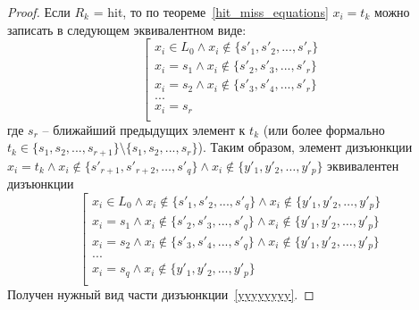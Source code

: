 \begin{proof}
  Если $R_k$ = hit, то по теореме~\ref{hit_miss_equations} $x_i =
  t_k$ можно записать в следующем эквивалентном виде:
  $$\left[\begin{array}{l}
  x_i \in L_0 \wedge x_i \notin \{s'_1, s'_2, ..., s'_r\}\\
  x_i = s_1 \wedge x_i \notin \{s'_2, s'_3, ..., s'_r\}\\
  x_i = s_2 \wedge x_i \notin \{s'_3, s'_4, ..., s'_r\}\\
  ...\\
  x_i = s_r\\
  \end{array} \right.
  $$
  где $s_r$ -- ближайший предыдущих элемент к $t_k$ (или более
  формально $t_k \in \{s_1, s_2, ..., s_{r+1}\} \setminus \{s_1, s_2, ...,
  s_r\}$). Таким образом, элемент дизъюнкции $x_i = t_k \wedge x_i
  \notin \{s'_{r+1}, s'_{r+2}, \dots, s'_q\} \wedge x_i \notin \{y'_1,
  y'_2, \dots, y'_p\}$ эквивалентен дизъюнкции
  $$\left[\begin{array}{l}
  x_i \in L_0 \wedge x_i \notin \{s'_1, s'_2, ..., s'_q\} \wedge x_i \notin \{y'_1,
  y'_2, \dots, y'_p\}\\
  x_i = s_1 \wedge x_i \notin \{s'_2, s'_3, ..., s'_q\} \wedge x_i \notin \{y'_1,
  y'_2, \dots, y'_p\}\\
  x_i = s_2 \wedge x_i \notin \{s'_3, s'_4, ..., s'_q\} \wedge x_i \notin \{y'_1,
  y'_2, \dots, y'_p\}\\
  ...\\
  x_i = s_q \wedge x_i \notin \{y'_1, y'_2, \dots, y'_p\}\\
  \end{array}\right.
  $$
  Получен нужный вид части дизъюнкции~\ref{yyyyyyyy}.


\end{proof}
